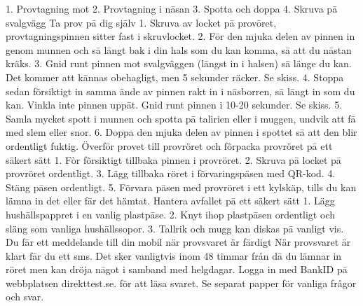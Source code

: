 1. Provtagning mot
2. Provtagning i nāsan
3. Spotta och doppa
4. Skruva pā
svalgvägg
Ta prov pā dig sjālv
1. Skruva av locket pā provōret, provtagningspinnen sitter fast i skruvlocket.
2. Fōr den mjuka delen av pinnen in genom munnen och sā lāngt bak i din hals som du kan komma, sā att du nāstan kräks.
3. Gnid runt pinnen mot svalgväggen (lāngst in i halsen) sā länge du kan. Det kommer att kānnas obehagligt, men 5 sekunder räcker. Se skiss.
4. Stoppa sedan fõrsiktigt in samma ände av pinnen rakt in i nāsborren, sā lāngt in som du kan. Vinkla inte pinnen uppāt. Gnid runt pinnen i 10-20 sekunder. Se skiss.
5. Samla mycket spott i munnen och spotta pā talirien eller i muggen, undvik att fā med slem eller snor.
6. Doppa den mjuka delen av pinnen i spottet sā att den blir ordentligt fuktig.
Överför provet till provröret och fõrpacka provröret pā ett säkert sätt
1. Fòr fõrsiktigt tillbaka pinnen i provröret.
2. Skruva pā locket pā provröret ordentligt.
3. Lägg tillbaka röret i fõrvaringspäsen med QR-kod.
4. Stäng pāsen ordentligt.
5. Fõrvara pāsen med provröret i ett kylskäp, tills du kan lämna in det eller fār det hämtat.
Hantera avfallet pā ett säkert sätt
1. Lägg hushāllspappret i en vanlig plastpāse.
2. Knyt ihop plastpāsen ordentligt och släng som vanliga hushāllssopor.
3. Tallrik och mugg kan diskas pā vanligt vis.
Du fār ett meddelande till din mobil när provsvaret är färdigt
När provsvaret är klart fār du ett sms. Det sker vanligtvis inom 48 timmar från dā du lämnar in röret men kan dröja nāgot i samband med helgdagar. Logga in med BankID pā webbplatsen direkttest.se. för att läsa svaret.
Se separat papper för vanliga frågor och svar.